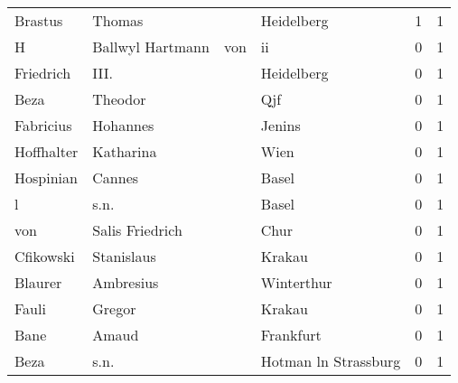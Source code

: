 \begin{tabular}{llllrr}
                  Brastus &                             Thomas &             &                                  Heidelberg &          1 &         1 \\
                        H &                   Ballwyl Hartmann &         von &                                          ii &          0 &         1 \\
                Friedrich &                               III. &             &                                  Heidelberg &          0 &         1 \\
                     Beza &                            Theodor &             &                                         Qjf &          0 &         1 \\
                Fabricius &                           Hohannes &             &                                      Jenins &          0 &         1 \\
               Hoffhalter &                          Katharina &             &                                        Wien &          0 &         1 \\
                Hospinian &                             Cannes &             &                                       Basel &          0 &         1 \\
                        l &                               s.n. &             &                                       Basel &          0 &         1 \\
                      von &                    Salis Friedrich &             &                                        Chur &          0 &         1 \\
                Cfikowski &                         Stanislaus &             &                                      Krakau &          0 &         1 \\
                  Blaurer &                          Ambresius &             &                                  Winterthur &          0 &         1 \\
                    Fauli &                             Gregor &             &                                      Krakau &          0 &         1 \\
                     Bane &                              Amaud &             &                                   Frankfurt &          0 &         1 \\
                     Beza &                               s.n. &             &                        Hotman ln Strassburg &          0 &         1 \\

\end{tabular}
